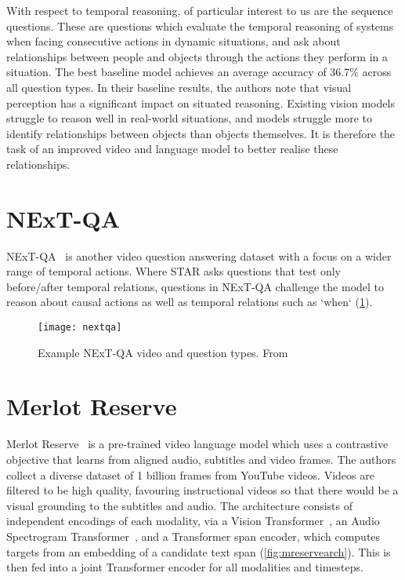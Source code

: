 With respect to temporal reasoning, of particular interest to us are the
sequence questions. These are questions which evaluate the temporal reasoning
of systems when facing consecutive actions in dynamic situations, and ask about
relationships between people and objects through the actions they perform in a
situation. The best baseline model achieves an average accuracy of 36.7\%
across all question types. In their baseline results, the authors note that
visual perception has a significant impact on situated reasoning. Existing
vision models struggle to reason well in real-world situations, and models
struggle more to identify relationships between objects than objects
themselves. It is therefore the task of an improved video and language model to
better realise these relationships.

\section{NExT-QA}

NExT-QA~\citep{xiao2021nextqa} is another video question answering dataset with
a focus on a wider range of temporal actions. Where STAR asks questions that
test only before/after temporal relations, questions in NExT-QA challenge the
model to reason about causal actions as well as temporal relations such as
`when` (\cref{fig:nextqa}).

\begin{figure}[tp]
	\centering
	\texttt{[image: nextqa]}
	\caption{Example NExT-QA video and question types.
		From~\citet{xiao2021nextqa}}
	\label{fig:nextqa}
\end{figure}

\section{Merlot Reserve}

Merlot Reserve~\citep{zellers2022mreserve} is a pre-trained video language model
which uses a contrastive objective that learns from aligned audio, subtitles
and video frames. The authors collect a diverse dataset of 1 billion frames
from YouTube videos. Videos are filtered to be high quality, favouring
instructional videos so that there would be a visual grounding to the subtitles
and audio. The architecture consists of independent encodings of each modality,
via a Vision Transformer~\citep{dosovitskiy2021vit}, an Audio Spectrogram
Transformer~\citep{gong2021ast}, and a Transformer span encoder, which computes
targets from an embedding of a candidate text span
(\cref{fig:mreservearch}). This is then fed into a joint Transformer encoder
for all modalities and timesteps.

